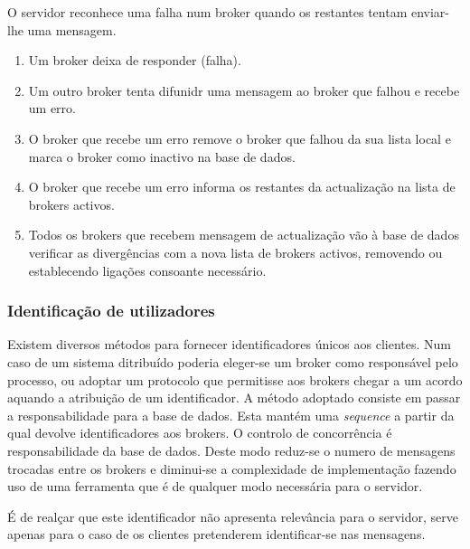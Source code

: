 O servidor reconhece uma falha num broker quando os restantes tentam enviar-lhe uma mensagem.

\begin{enumerate}
\item Um broker deixa de responder (falha).
\item Um outro broker tenta difunidr uma mensagem ao broker que falhou e recebe um erro.
\item O broker que recebe um erro remove o broker que falhou da sua lista local e marca o broker como inactivo na base de dados.
\item O broker que recebe um erro informa os restantes da actualização na lista de brokers activos.
\item Todos os brokers que recebem mensagem de actualização vão à base de dados verificar as divergências com a nova lista de brokers activos, removendo ou establecendo ligações consoante necessário.
\end{enumerate}


\subsubsection{Identificação de utilizadores}
Existem diversos métodos para fornecer identificadores únicos aos clientes. Num caso de um sistema ditribuído poderia eleger-se um broker como responsável pelo processo, ou adoptar um protocolo que permitisse aos brokers chegar a um acordo aquando a atribuição de um identificador. A método adoptado consiste em passar a responsabilidade para a base de dados. Esta mantém uma \textit{sequence} a partir da qual devolve identificadores aos brokers. O controlo de concorrência é responsabilidade da base de dados. Deste modo reduz-se o numero de mensagens trocadas entre os brokers e diminui-se a complexidade de implementação fazendo uso de uma ferramenta que é de qualquer modo necessária para o servidor.

É de realçar que este identificador não apresenta relevância para o servidor, serve apenas para o caso de os clientes pretenderem identificar-se nas mensagens.
